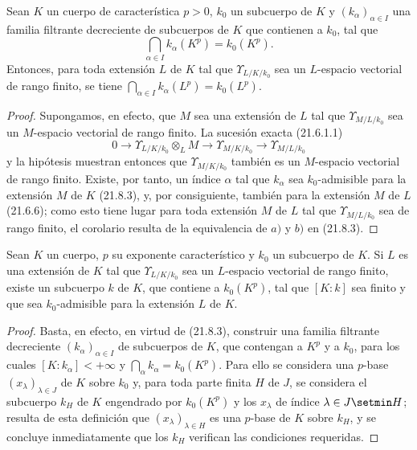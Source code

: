 \begin{corollary}[21.8.5]
\label{0.21.8.5-fr}
Sean $K$ un cuerpo de característica $p>0$, $k_0$ un subcuerpo de $K$ y
$(k_\alpha)_{\alpha\in I}$ una familia filtrante decreciente de subcuerpos de
$K$ que contienen a $k_0$, tal que
\[
  \bigcap_{\alpha\in I}k_\alpha(K^p)=k_0(K^p).
\]
Entonces, para toda extensión $L$ de $K$ tal que $\Upsilon_{L/K/k_0}$ sea un
$L$-espacio vectorial de rango finito, se tiene
$\bigcap_{\alpha\in I}k_\alpha(L^p)=k_0(L^p)$.
\end{corollary}

\begin{proof}
Supongamos, en efecto, que $M$ sea una extensión de $L$ tal que
$\Upsilon_{M/L/k_0}$ sea un $M$-espacio vectorial de rango finito. La sucesión
exacta (21.6.1.1)
\[
  0\longrightarrow \Upsilon_{L/K/k_0}\otimes_L M
  \longrightarrow \Upsilon_{M/K/k_0}
  \longrightarrow \Upsilon_{M/L/k_0}
\]
y la hipótesis muestran entonces que $\Upsilon_{M/K/k_0}$ también es un
$M$-espacio vectorial de rango finito. Existe, por tanto, un índice $\alpha$
tal que $k_\alpha$ sea $k_0$-admisible para la extensión $M$ de $K$ (21.8.3),
y, por consiguiente, también para la extensión $M$ de $L$ (21.6.6); como esto
tiene lugar para toda extensión $M$ de $L$ tal que $\Upsilon_{M/L/k_0}$ sea de
rango finito, el corolario resulta de la equivalencia de $a)$ y $b)$ en
(21.8.3).
\end{proof}

\begin{corollary}[21.8.6]
\label{0.21.8.6-fr}
Sean $K$ un cuerpo, $p$ su exponente característico y $k_0$ un subcuerpo de
$K$. Si $L$ es una extensión de $K$ tal que $\Upsilon_{L/K/k_0}$ sea un
$L$-espacio vectorial de rango finito, existe un subcuerpo $k$ de $K$, que
contiene a $k_0(K^p)$, tal que $[K:k]$ sea finito y que sea $k_0$-admisible
para la extensión $L$ de $K$.
\end{corollary}

\begin{proof}
Basta, en efecto, en virtud de (21.8.3), construir una familia filtrante
decreciente $(k_\alpha)_{\alpha\in I}$ de subcuerpos de $K$, que contengan a
$K^p$ y a $k_0$, para los cuales $[K:k_\alpha]<+\infty$ y
$\bigcap_\alpha k_\alpha=k_0(K^p)$. Para ello se considera una $p$-base
$(x_\lambda)_{\lambda\in J}$ de $K$ sobre $k_0$ y, para toda parte finita
$H$ de $J$, se considera el subcuerpo $k_H$ de $K$ engendrado por
$k_0(K^p)$ y los $x_\lambda$ de índice $\lambda\in J\setmin H$; resulta de esta
definición que $(x_\lambda)_{\lambda\in H}$ es una $p$-base de $K$ sobre
$k_H$, y se concluye inmediatamente que los $k_H$ verifican las condiciones
requeridas.
\end{proof}

